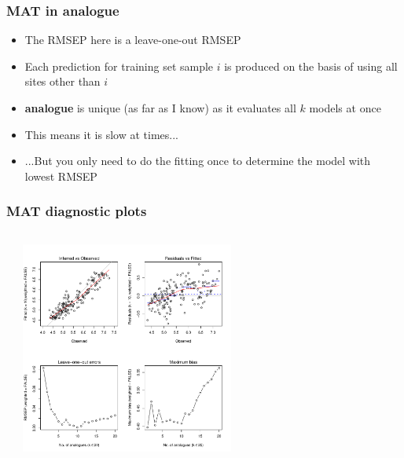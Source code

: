 \documentclass{beamer}
\begin{document}
\begin{frame}
    \frametitle{MAT in analogue}
    \begin{itemize}
        \item The RMSEP here is a leave-one-out RMSEP
        \item Each prediction for training set sample $i$ is produced on the basis of using all sites other than $i$
        \item \textbf{analogue} is unique (as far as I know) as it evaluates all $k$ models at once
        \item This means it is slow at times...
        \item ...But you only need to do the fitting once to determine the model with lowest RMSEP
    \end{itemize}
\end{frame}

\begin{frame}[fragile]
    \frametitle{MAT diagnostic plots}
    \begin{columns}
    \column{5cm}
    \scriptsize
\begin{Schunk}
\begin{Sinput}
[0;34mr$>[0m opar <- par(mfrow = c(2,2))
[0;34mr$>[0m plot(swap.mat)
[0;34mr$>[0m par(opar)
\end{Sinput}
\end{Schunk}
    \normalsize
    
    \column{7cm}
    \includegraphics[width=7cm]{mat_diag_plots}
    \end{columns}
\end{frame}
\end{document}
